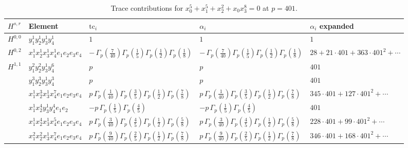 \documentclass[11pt]{article}
\begin{document}
\begin{table}[ht]
\centering
\caption{Trace contributions for $x_0^{5} + x_1^{5} + x_2^{2} + x_0 x_3^{8} = 0$ at $p=401$.}\label{tab:deformed-18}
\renewcommand{\arraystretch}{1.1}
{\scriptsize
\begin{tabular}{@{}lllll@{}}
\toprule
$H^{s,r}$ & Element & $\mathrm{tc}_i$ & $\alpha_i$ & $\alpha_i$ expanded \\
\midrule
$H^{0,0}$ & $y_{1}^{1} y_{2}^{1} y_{3}^{1} y_{4}^{1}$ & $1$ & $1$ & $1$ \\
\midrule
$H^{0,2}$ & $x_{1}^{1} x_{2}^{1} x_{3}^{1} x_{4}^{1}  e_{1} e_{2} e_{3} e_{4}$ & $- \, \Gamma_p \left( \frac{7}{40} \right) \Gamma_p \left( \frac{1}{5} \right) \Gamma_p \left( \frac{1}{2} \right) \Gamma_p \left( \frac{1}{8} \right)$ & $- \, \Gamma_p \left( \frac{7}{40} \right) \Gamma_p \left( \frac{1}{5} \right) \Gamma_p \left( \frac{1}{2} \right) \Gamma_p \left( \frac{1}{8} \right)$ & $28{+}21{\cdot}401{+}363{\cdot}401^{2}{+}\cdots$ \\
\midrule
$H^{1,1}$ & $y_{1}^{2} y_{2}^{2} y_{3}^{1} y_{4}^{6}$ & $p \,$ & $p \,$ & $401$ \\
 & $y_{1}^{3} y_{2}^{3} y_{3}^{1} y_{4}^{3}$ & $p \,$ & $p \,$ & $401$ \\
 & $x_{1}^{1} x_{2}^{3} x_{3}^{1} x_{4}^{7}  e_{1} e_{2} e_{3} e_{4}$ & $p \, \Gamma_p \left( \frac{1}{40} \right) \Gamma_p \left( \frac{3}{5} \right) \Gamma_p \left( \frac{1}{2} \right) \Gamma_p \left( \frac{7}{8} \right)$ & $p \, \Gamma_p \left( \frac{1}{40} \right) \Gamma_p \left( \frac{3}{5} \right) \Gamma_p \left( \frac{1}{2} \right) \Gamma_p \left( \frac{7}{8} \right)$ & $345{\cdot}401{+}127{\cdot}401^{2}{+}\cdots$ \\
 & $x_{1}^{1} x_{2}^{4} y_{3}^{1} y_{4}^{4} e_{1} e_{2}$ & $- p \, \Gamma_p \left( \frac{1}{5} \right) \Gamma_p \left( \frac{4}{5} \right)$ & $- p \, \Gamma_p \left( \frac{1}{5} \right) \Gamma_p \left( \frac{4}{5} \right)$ & $401$ \\
 & $x_{1}^{1} x_{2}^{4} x_{3}^{1} x_{4}^{5}  e_{1} e_{2} e_{3} e_{4}$ & $p \, \Gamma_p \left( \frac{3}{40} \right) \Gamma_p \left( \frac{4}{5} \right) \Gamma_p \left( \frac{1}{2} \right) \Gamma_p \left( \frac{5}{8} \right)$ & $p \, \Gamma_p \left( \frac{3}{40} \right) \Gamma_p \left( \frac{4}{5} \right) \Gamma_p \left( \frac{1}{2} \right) \Gamma_p \left( \frac{5}{8} \right)$ & $228{\cdot}401{+}99{\cdot}401^{2}{+}\cdots$ \\
 & $x_{1}^{2} x_{2}^{2} x_{3}^{1} x_{4}^{7}  e_{1} e_{2} e_{3} e_{4}$ & $p \, \Gamma_p \left( \frac{9}{40} \right) \Gamma_p \left( \frac{2}{5} \right) \Gamma_p \left( \frac{1}{2} \right) \Gamma_p \left( \frac{7}{8} \right)$ & $p \, \Gamma_p \left( \frac{9}{40} \right) \Gamma_p \left( \frac{2}{5} \right) \Gamma_p \left( \frac{1}{2} \right) \Gamma_p \left( \frac{7}{8} \right)$ & $346{\cdot}401{+}168{\cdot}401^{2}{+}\cdots$ \\

\end{tabular}}
\end{table}
\end{document}

